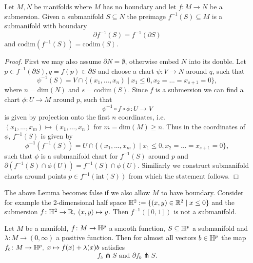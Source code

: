     \begin{lemma}
        \label{on_mnf_with_boundary:lem:preimage_of_submersion}
            Let $M,N$ be manifolds where $M$ has no boundary and let $f \colon M \to N$ be a submersion. Given a submanifold $S \subseteq N$ the preimage $f^{-1}(S) \subseteq M$ is a submanifold with boundary 
            \[
            \partial f^{-1}(S) = f^{-1}(\partial S)
            \]
            and $\mathrm{codim}(f^{-1}(S)) = \mathrm{codim}(S)$. 
        \end{lemma}
        \begin{proof}
            First we may also assume $\partial N = \emptyset$, otherwise embed $N$ into its double. Let $p \in f^{-1}(\partial S), q = f(p) \in \partial S$ and choose a chart $\psi \colon V \to N$ around $q$, such that 
            \[
            \psi^{-1}(S) = V \cap \{(x_1,\ldots,x_n) \mid x_1 \leq 0, x_2 = \ldots = x_{s+1} = 0\},
            \]
            where $n = \mathrm{dim}(N)$ and $s = \mathrm{codim}(S)$. Since $f$ is a submersion we can find a chart $\phi \colon U \to M$ around $p$, such that 
            \[
            \psi^{-1} \circ f \circ \phi \colon U \to V
            \]
            is given by projection onto the first $n$ coordinates, i.e. $(x_1,\ldots,x_m) \mapsto (x_1,\ldots, x_n)$ for $m = \mathrm{dim}(M) \geq n$. Thus in the coordinates of $\phi$, $f^{-1}(S)$ is given by 
            \[
            \phi^{-1}(f^{-1}(S)) = U \cap \{(x_1,\ldots,x_m) \mid x_1 \leq 0, x_2 = \ldots = x_{s+1} = 0\},
            \]
            such that $\phi$ is a submanifold chart for $f^{-1}(S)$ around $p$ and $\partial(f^{-1}(S) \cap \phi(U)) = f^{-1}(S) \cap \phi(U)$. Similiarly we construct submanifold charts around points $p \in f^{-1}(\mathrm{int}(S))$ from which the statement follows.
    \end{proof}

    The above Lemma becomes false if we also allow $M$ to have boundary. Consider for example the $2$-dimensional half space $\mathbb{H}^2 := \{(x,y) \in \mathbb{R}^2 \mid x \leq 0\}$ and the submersion $f \colon \mathbb{H}^2 \to \mathbb{R}, \; (x,y) \mapsto y$. Then $f^{-1}([0,1])$ is not a submanifold.

\begin{lemma}
    \label{whitney_top:lem:approx_transversality_lemma}
    Let $M$ be a manifold, $f \colon M \to \mathbb{H}^p$ a smooth function, $S \subseteq \mathbb{H}^p$ a submanifold and $\lambda \colon M \to (0,\infty)$ a positive function. Then for almost all vectors $b \in \mathbb{H}^p$ the map
    $f_b \colon M \to \mathbb{H}^p, \; x \mapsto f(x) + \lambda(x)b$ satisfies
    \[
    f_b \pitchfork S \text{ and } \partial f_b \pitchfork S.
    \]
\end{lemma}


